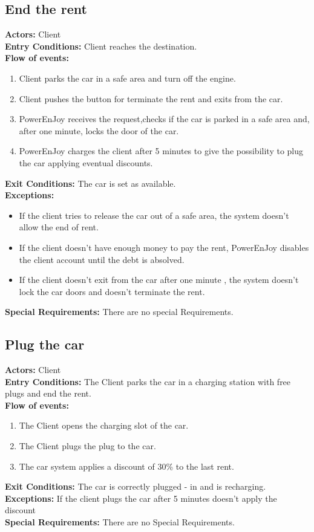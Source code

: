 \subsection{End the rent}
%
\textbf{Actors:}
Client \\
%
\textbf{Entry Conditions:}
Client reaches the destination. \\
%
\textbf{Flow of events:}
\begin{enumerate}
\item Client parks the car in a safe area and turn off the engine.
\item Client pushes the button for terminate the rent and exits from the car.
\item PowerEnJoy receives the request,checks if the car is parked in a safe area and, after one minute, locks the door of the car.
\item PowerEnJoy charges the client after 5 minutes to give the possibility to plug the car applying eventual discounts.
\end{enumerate}
%
\textbf{Exit Conditions:}
The car is set as available. \\
%
\textbf{Exceptions:}
\begin{itemize}
\item If the client tries to release the car out of a safe area, the system doesn't allow the end of rent.
\item If the client doesn't have enough money to pay the rent, PowerEnJoy disables the client account until the debt is absolved.
\item If the client doesn't exit from the car after one minute , the system doesn't lock the car doors and doesn't terminate the rent.
\end{itemize}
%
\textbf{Special Requirements:}
There are no special Requirements.





\subsection{Plug the car}
%
\textbf{Actors:}
Client \\
%
\textbf{Entry Conditions:}
The Client parks the car in a charging station with free plugs and end the rent. \\
%
\textbf{Flow of events:}
\begin{enumerate}
\item The Client opens the charging slot of the car.
\item The Client plugs the plug to the car.
\item The car system applies a discount of 30\% to the last rent.
\end{enumerate}
%
\textbf{Exit Conditions:}
The car is correctly plugged - in and is recharging.\\
%
\textbf{Exceptions:}
If the client plugs the car after 5 minutes doesn't apply the discount\\
%
\textbf{Special Requirements:}
There are no Special Requirements.




